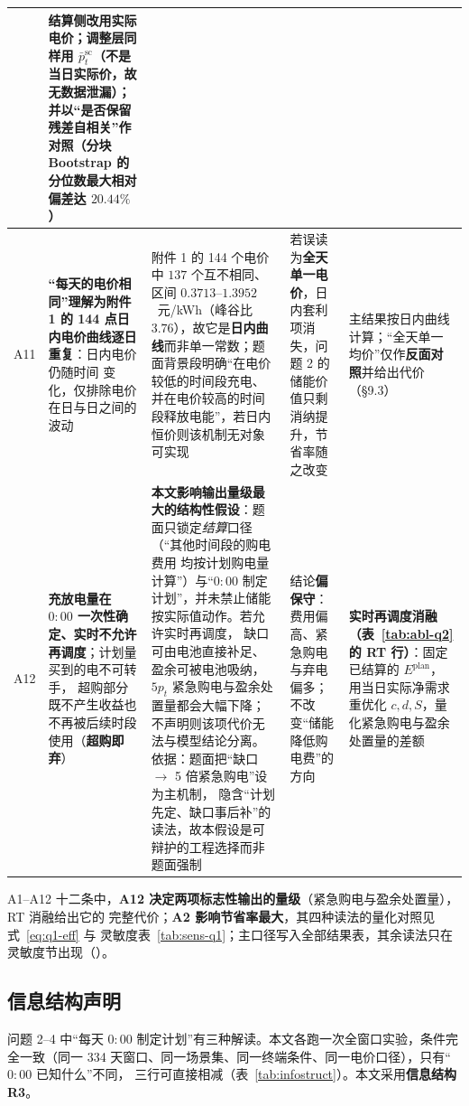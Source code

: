 \begin{table}[htbp]
\begin{tabularx}{\linewidth}{C{0.62cm} L{2.65cm} L{4.30cm} L{1.95cm} Y}
      & 结算侧改用实际电价；\textbf{调整层同样用 \(\bar p^{\text{sc}}_t\)（不是当日实际价，故无数据泄漏）}；
        并以“是否保留残差自相关”作对照（分块 Bootstrap 的分位数最大相对偏差达 \(20.44\%\)） \\
    \midrule
    A11 & \textbf{“每天的电价相同”理解为附件 1 的 144 点日内电价曲线逐日重复}：日内电价仍随时间
         变化，仅排除电价在日与日之间的波动
      & 附件 1 的 144 个电价中 \(137\) 个互不相同、区间 \(0.3713\)--\(1.3952\)~元/kWh（峰谷比
        \(3.76\)），故它是\textbf{日内曲线}而非单一常数；题面背景段明确“在电价较低的时间段充电、
        并在电价较高的时间段释放电能”，若日内恒价则该机制无对象可实现
      & 若误读为\textbf{全天单一电价}，日内套利项消失，问题 2 的储能价值只剩消纳提升，节省率随之改变
      & 主结果按日内曲线计算；“全天单一均价”仅作\textbf{反面对照}并给出代价（\S9.3） \\
    \midrule
    A12 & \textbf{充放电量在 \(0{:}00\) 一次性确定、实时不允许再调度}；计划量买到的电不可转手，
          超购部分既不产生收益也不再被后续时段使用（\textbf{超购即弃}）
      & \textbf{本文影响输出量级最大的结构性假设}：题面只锁定\emph{结算}口径（“其他时间段的购电费用
        均按计划购电量计算”）与“\(0{:}00\) 制定计划”，并未禁止储能按实际值动作。若允许实时再调度，
        缺口可由电池直接补足、盈余可被电池吸纳，\(5p_t\) 紧急购电与盈余处置量都会大幅下降；
        不声明则该项代价无法与模型结论分离。依据：题面把“缺口 \(\to\) 5 倍紧急购电”设为主机制，
        隐含“计划先定、缺口事后补”的读法，故本假设是可辩护的工程选择而非题面强制
      & 结论\textbf{偏保守}：费用偏高、紧急购电与弃电偏多；不改变“储能降低购电费”的方向
      & \textbf{实时再调度消融（表~\ref{tab:abl-q2} 的 RT 行）}：固定已结算的 \(E^{\text{plan}}\)，
        用当日实际净需求重优化 \(c,d,S\)，量化紧急购电与盈余处置量的差额 \\
    \bottomrule
  \end{tabularx}
\end{table}

A1--A12 十二条中，\textbf{A12 决定两项标志性输出的量级}（紧急购电与盈余处置量），RT 消融给出它的
完整代价；\textbf{A2 影响节省率最大}，其四种读法的量化对照见式~\eqref{eq:q1-eff} 与
灵敏度表~\ref{tab:sens-q1}；主口径写入全部结果表，其余读法只在灵敏度节出现（）。

\subsection{信息结构声明}

问题 2--4 中“每天 \(0{:}00\) 制定计划”有三种解读。本文各跑一次全窗口实验，条件完全一致（同一
334 天窗口、同一场景集、同一终端条件、同一电价口径），只有“\(0{:}00\) 已知什么”不同，
三行可直接相减（表~\ref{tab:infostruct}）。本文采用\textbf{信息结构 R3}。

